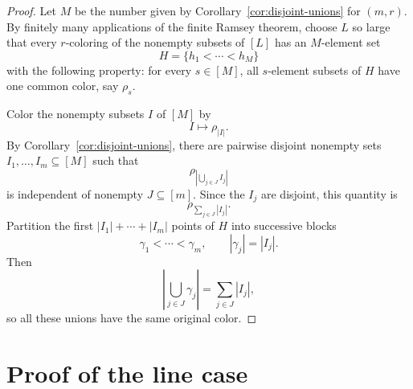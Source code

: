 \documentclass[11pt]{article}
\theoremstyle{remark}
\begin{document}
\begin{proof}
Let $M$ be the number given by Corollary~\ref{cor:disjoint-unions} for
$(m,r)$. By finitely many applications of the finite Ramsey theorem, choose
$L$ so large that every $r$-coloring of the nonempty subsets of $[L]$ has
an $M$-element set
\[
  H=\{h_1<\cdots<h_M\}
\]
with the following property: for every $s\in[M]$, all $s$-element subsets
of $H$ have one common color, say $\rho_s$.

Color the nonempty subsets $I$ of $[M]$ by
\[
  I\longmapsto \rho_{|I|}.
\]
By Corollary~\ref{cor:disjoint-unions}, there are pairwise disjoint
nonempty sets $I_1,\dots,I_m\subseteq[M]$ such that
\[
  \rho_{|\bigcup_{j\in J}I_j|}
\]
is independent of nonempty $J\subseteq[m]$. Since the $I_j$ are disjoint,
this quantity is
\[
  \rho_{\sum_{j\in J}|I_j|}.
\]
Partition the first $|I_1|+\cdots+|I_m|$ points of $H$ into successive
blocks
\[
  \gamma_1<\cdots<\gamma_m,
  \qquad |\gamma_j|=|I_j|.
\]
Then
\[
  \left|\bigcup_{j\in J}\gamma_j\right|
  =\sum_{j\in J}|I_j|,
\]
so all these unions have the same original color.
\end{proof}

\section{Proof of the line case}
\end{document}
